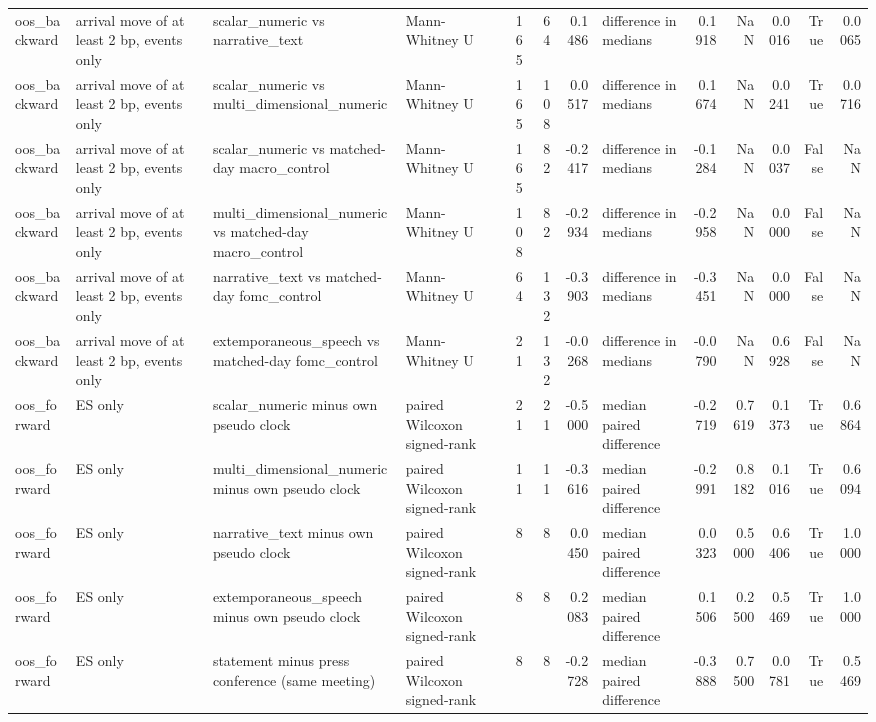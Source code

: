 \begin{tabular}{llllrrrlrrrrr}
oos_backward & arrival move of at least 2 bp, events only & scalar_numeric vs narrative_text & Mann-Whitney U & 165 & 64 & 0.1486 & difference in medians & 0.1918 & NaN & 0.0016 & True & 0.0065 \\
oos_backward & arrival move of at least 2 bp, events only & scalar_numeric vs multi_dimensional_numeric & Mann-Whitney U & 165 & 108 & 0.0517 & difference in medians & 0.1674 & NaN & 0.0241 & True & 0.0716 \\
oos_backward & arrival move of at least 2 bp, events only & scalar_numeric vs matched-day macro_control & Mann-Whitney U & 165 & 82 & -0.2417 & difference in medians & -0.1284 & NaN & 0.0037 & False & NaN \\
oos_backward & arrival move of at least 2 bp, events only & multi_dimensional_numeric vs matched-day macro_control & Mann-Whitney U & 108 & 82 & -0.2934 & difference in medians & -0.2958 & NaN & 0.0000 & False & NaN \\
oos_backward & arrival move of at least 2 bp, events only & narrative_text vs matched-day fomc_control & Mann-Whitney U & 64 & 132 & -0.3903 & difference in medians & -0.3451 & NaN & 0.0000 & False & NaN \\
oos_backward & arrival move of at least 2 bp, events only & extemporaneous_speech vs matched-day fomc_control & Mann-Whitney U & 21 & 132 & -0.0268 & difference in medians & -0.0790 & NaN & 0.6928 & False & NaN \\
oos_forward & ES only & scalar_numeric minus own pseudo clock & paired Wilcoxon signed-rank & 21 & 21 & -0.5000 & median paired difference & -0.2719 & 0.7619 & 0.1373 & True & 0.6864 \\
oos_forward & ES only & multi_dimensional_numeric minus own pseudo clock & paired Wilcoxon signed-rank & 11 & 11 & -0.3616 & median paired difference & -0.2991 & 0.8182 & 0.1016 & True & 0.6094 \\
oos_forward & ES only & narrative_text minus own pseudo clock & paired Wilcoxon signed-rank & 8 & 8 & 0.0450 & median paired difference & 0.0323 & 0.5000 & 0.6406 & True & 1.0000 \\
oos_forward & ES only & extemporaneous_speech minus own pseudo clock & paired Wilcoxon signed-rank & 8 & 8 & 0.2083 & median paired difference & 0.1506 & 0.2500 & 0.5469 & True & 1.0000 \\
oos_forward & ES only & statement minus press conference (same meeting) & paired Wilcoxon signed-rank & 8 & 8 & -0.2728 & median paired difference & -0.3888 & 0.7500 & 0.0781 & True & 0.5469 \\

\end{tabular}
